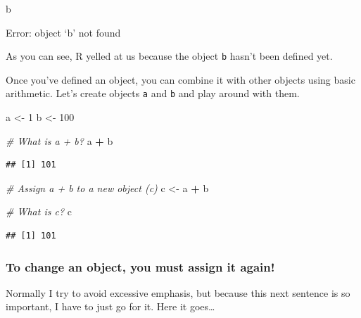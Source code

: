 \documentclass[
]{book}
\newenvironment{Shaded}{\begin{snugshade}}{\end{snugshade}}
\newcommand{\CommentTok}[1]{\textcolor[rgb]{0.56,0.35,0.01}{\textit{#1}}}
\newcommand{\DecValTok}[1]{\textcolor[rgb]{0.00,0.00,0.81}{#1}}
\newcommand{\NormalTok}[1]{#1}
\newcommand{\OperatorTok}[1]{\textcolor[rgb]{0.81,0.36,0.00}{\textbf{#1}}}
\newcommand{\StringTok}[1]{\textcolor[rgb]{0.31,0.60,0.02}{#1}}
\begin{document}
\begin{Shaded}
\begin{Highlighting}[]
\NormalTok{b}
\end{Highlighting}
\end{Shaded}

\begin{error}

Error: object `b' not found

\end{error}

As you can see, R yelled at us because the object \texttt{b} hasn't been defined yet.

Once you've defined an object, you can combine it with other objects using basic arithmetic. Let's create objects \texttt{a} and \texttt{b} and play around with them.

\begin{Shaded}
\begin{Highlighting}[]
\NormalTok{a <-}\StringTok{ }\DecValTok{1}
\NormalTok{b <-}\StringTok{ }\DecValTok{100}

\CommentTok{# What is a + b?}
\NormalTok{a }\OperatorTok{+}\StringTok{ }\NormalTok{b}
\end{Highlighting}
\end{Shaded}

\begin{verbatim}
## [1] 101
\end{verbatim}

\begin{Shaded}
\begin{Highlighting}[]
\CommentTok{# Assign a + b to a new object (c)}
\NormalTok{c <-}\StringTok{ }\NormalTok{a }\OperatorTok{+}\StringTok{ }\NormalTok{b}

\CommentTok{# What is c?}
\NormalTok{c}
\end{Highlighting}
\end{Shaded}

\begin{verbatim}
## [1] 101
\end{verbatim}

\hypertarget{to-change-an-object-you-must-assign-it-again}{%
\subsubsection{To change an object, you must assign it again!}\label{to-change-an-object-you-must-assign-it-again}}

Normally I try to avoid excessive emphasis, but because this next sentence is so important, I have to just go for it. Here it goes\ldots{}
\end{document}
